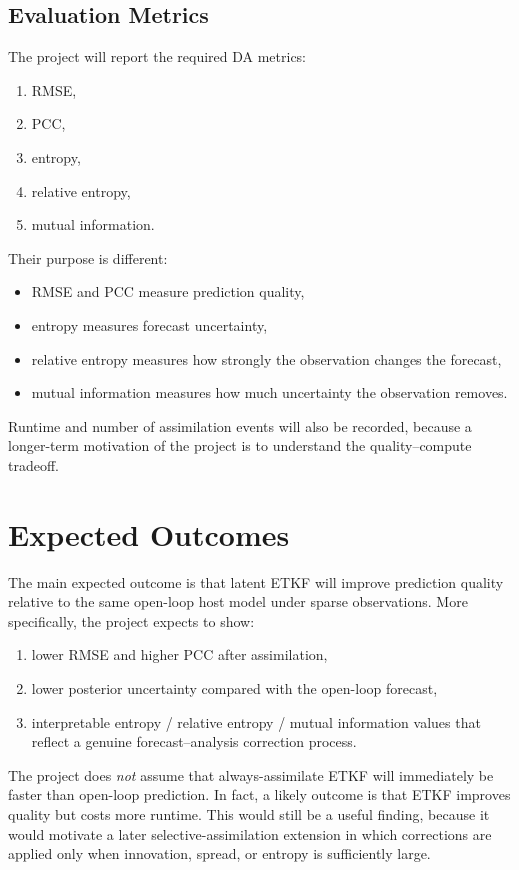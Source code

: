 \documentclass{article}
\begin{document}
\subsection{Evaluation Metrics}

The project will report the required DA metrics:
\begin{enumerate}[leftmargin=1.2em]
    \item RMSE,
    \item PCC,
    \item entropy,
    \item relative entropy,
    \item mutual information.
\end{enumerate}

Their purpose is different:
\begin{itemize}[leftmargin=1.2em]
    \item RMSE and PCC measure prediction quality,
    \item entropy measures forecast uncertainty,
    \item relative entropy measures how strongly the observation changes the forecast,
    \item mutual information measures how much uncertainty the observation removes.
\end{itemize}

Runtime and number of assimilation events will also be recorded, because a longer-term motivation of the project is to understand the quality--compute tradeoff.

\section{Expected Outcomes}

The main expected outcome is that latent ETKF will improve prediction quality relative to the same open-loop host model under sparse observations. More specifically, the project expects to show:
\begin{enumerate}[leftmargin=1.2em]
    \item lower RMSE and higher PCC after assimilation,
    \item lower posterior uncertainty compared with the open-loop forecast,
    \item interpretable entropy / relative entropy / mutual information values that reflect a genuine forecast--analysis correction process.
\end{enumerate}

The project does \emph{not} assume that always-assimilate ETKF will immediately be faster than open-loop prediction. In fact, a likely outcome is that ETKF improves quality but costs more runtime. This would still be a useful finding, because it would motivate a later selective-assimilation extension in which corrections are applied only when innovation, spread, or entropy is sufficiently large.
\end{document}
